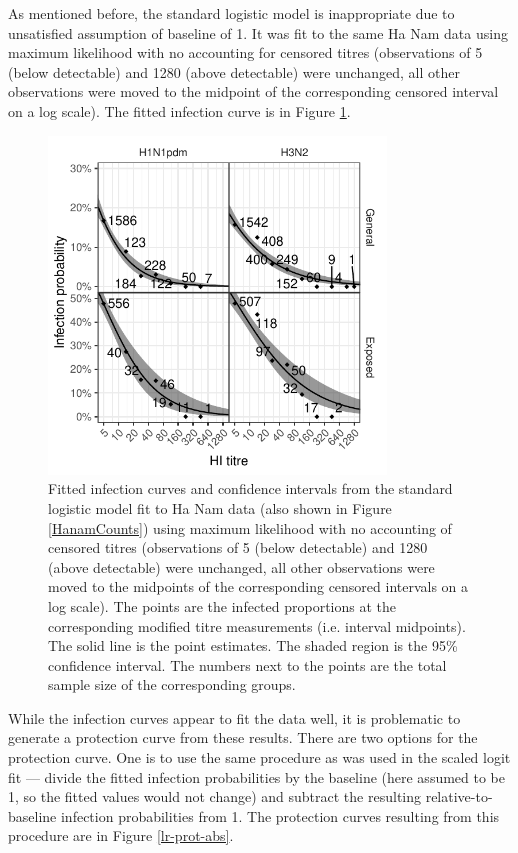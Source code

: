 As mentioned before, the standard logistic model is inappropriate due to unsatisfied assumption of baseline of 1. It was fit to the same Ha Nam data using maximum likelihood with no accounting for censored titres (observations of 5 (below detectable) and 1280 (above detectable) were unchanged, all other observations were moved to the midpoint of the corresponding censored interval on a log scale). The fitted infection curve is in Figure \ref{lr-inf}.

\begin{figure}[htp]
	\centering
	\includegraphics[width=0.8\textwidth]{../fit-logistic-plot/hanam-hi-inf.pdf}
	\caption{
		Fitted infection curves and confidence intervals from the standard logistic model fit to Ha Nam data (also shown in Figure \ref{HanamCounts}) using maximum likelihood with no accounting of censored titres (observations of 5 (below detectable) and 1280 (above detectable) were unchanged, all other observations were moved to the midpoints of the corresponding censored intervals on a log scale). The points are the infected proportions at the corresponding modified titre measurements (i.e. interval midpoints). The solid line is the point estimates. The shaded region is the 95\% confidence interval. The numbers next to the points are the total sample size of the corresponding groups.
	}
	\label{lr-inf}
\end{figure}

While the infection curves appear to fit the data well, it is problematic to generate a protection curve from these results. There are two options for the protection curve. One is to use the same procedure as was used in the scaled logit fit --- divide the fitted infection probabilities by the baseline (here assumed to be 1, so the fitted values would not change) and subtract the resulting relative-to-baseline infection probabilities from 1. The protection curves resulting from this procedure are in Figure \ref{lr-prot-abs}.

